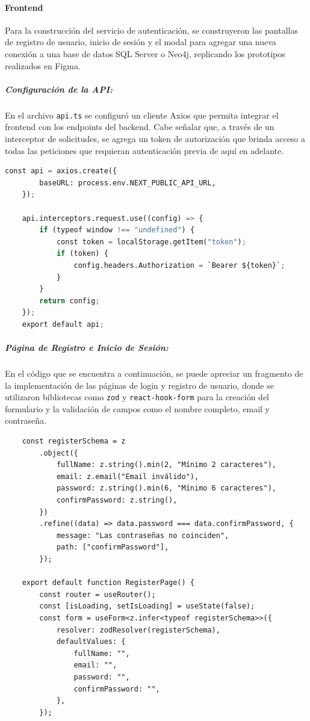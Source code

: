 \paragraph{Frontend}
Para la construcción del servicio de autenticación, se construyeron las pantallas de registro de usuario, inicio de sesión y el modal para agregar una nueva conexión a una base de datos SQL Server o Neo4j, replicando los prototipos realizados en Figma.

\subparagraph{Configuración de la API:}
En el archivo \texttt{api.ts} se configuró un cliente Axios que permita integrar el frontend con los endpoints del backend. Cabe señalar que, a través de un interceptor de solicitudes, se agrega un token de autorización que brinda acceso a todas las peticiones que requieran autenticación previa de aquí en adelante.

\begin{lstlisting}[language=Python]
    const api = axios.create({
        baseURL: process.env.NEXT_PUBLIC_API_URL,
    });

    api.interceptors.request.use((config) => {
        if (typeof window !== "undefined") {
            const token = localStorage.getItem("token");
            if (token) {
                config.headers.Authorization = `Bearer ${token}`;
            }
        }
        return config;
    });
    export default api;
\end{lstlisting}

\subparagraph{Página de Registro e Inicio de Sesión: }
En el código que se encuentra a continuación, se puede apreciar un fragmento de la implementación de las páginas de login y registro de usuario, donde se utilizaron bibliotecas como \texttt{zod} y \texttt{react-hook-form} para la creación del formulario y la validación de campos como el nombre completo, email y contraseña.

\begin{lstlisting}
    const registerSchema = z
        .object({
            fullName: z.string().min(2, "Mínimo 2 caracteres"),
            email: z.email("Email inválido"),
            password: z.string().min(6, "Mínimo 6 caracteres"),
            confirmPassword: z.string(),
        })
        .refine((data) => data.password === data.confirmPassword, {
            message: "Las contraseñas no coinciden",
            path: ["confirmPassword"],
        });

    export default function RegisterPage() {
        const router = useRouter();
        const [isLoading, setIsLoading] = useState(false);
        const form = useForm<z.infer<typeof registerSchema>>({
            resolver: zodResolver(registerSchema),
            defaultValues: {
                fullName: "",
                email: "",
                password: "",
                confirmPassword: "",
            },
        });
\end{lstlisting}

